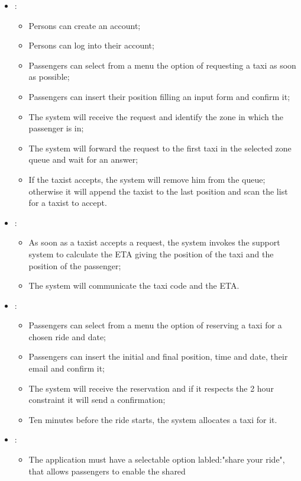 \begin {itemize}
\item [G1]:
	\begin{itemize}
	\item Persons can create an account;
	\item Persons can log into their account;
	\item Passengers can select from a menu the option of requesting a taxi as soon as possible; 
	\item Passengers can insert their position filling an input form and confirm it;
	\item The system will receive the request and identify the zone in which the passenger is in;
	\item The system will forward the request to the first taxi in the selected zone queue and wait for an answer;
	\item If the taxist accepts, the system will remove him from the queue; otherwise it will append the taxist to the last position and
scan the list for a taxist to accept.
	\end{itemize}
\item [G2]:
	\begin{itemize}
	\item As soon as a taxist accepts a request, the system invokes the support system to calculate the ETA giving the position of the 
	taxi and the position of the passenger;
	\item The system will communicate the taxi code and the ETA.
	\end{itemize}
\item [G3]:
	\begin{itemize}
	\item Passengers can select from a menu the option of reserving a taxi for a chosen ride and date; 
	\item Passengers can insert the initial and final position, time and date, their email and confirm it;
	\item The system will receive the reservation and if it respects the 2 hour constraint it will send a confirmation;
	\item Ten minutes before the ride starts, the system allocates a taxi for it.
	\end{itemize}
\item [G4]:
	\begin{itemize}
	\item The application must have a selectable option labled:"share your ride", that allows passengers to enable the shared 

\end{itemize}
\end{itemize}
